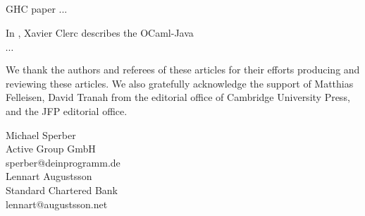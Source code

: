 \documentclass{jfp1}
\begin{document}
GHC paper ...

In \textit{}, Xavier Clerc describes the OCaml-Java

\vspace{1in}
$\cdots$
\vspace{1in}

We thank the authors and referees of these articles for their efforts
producing and reviewing these articles.  We also gratefully
acknowledge the support of Matthias Felleisen, David Tranah from the
editorial office of Cambridge University Press, and the JFP editorial
office.

\begin{flushright}
 Michael Sperber\\
  Active Group GmbH\\
  sperber@deinprogramm.de\\[2mm]
  Lennart Augustsson\\
  Standard Chartered Bank\\
  lennart@augustsson.net
\end{flushright}
\end{document}
